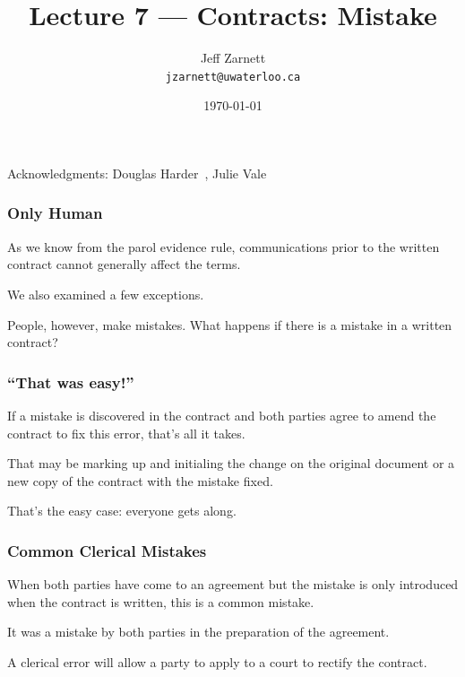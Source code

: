 

\title{Lecture 7 --- Contracts: Mistake }

\author{Jeff Zarnett \\ \small \texttt{jzarnett@uwaterloo.ca}}
\date{\today}




\begin{frame}
  \titlepage

\begin{center}
  \small{Acknowledgments: Douglas Harder~\cite{dwh}, Julie Vale~\cite{jv}}
  \end{center}
\end{frame}


\begin{frame}
\frametitle{Only Human}

As we know from the parol evidence rule, communications prior to the written contract cannot generally affect the terms.

We also examined a few exceptions. 

People, however, make mistakes. What happens if there is a mistake in a written contract?

\end{frame}


\begin{frame}
\frametitle{``That was easy!''}

If a mistake is discovered in the contract and both parties agree to amend the contract to fix this error, that's all it takes.

That may be marking up and initialing the change on the original document or a new copy of the contract with the mistake fixed.

That's the easy case: everyone gets along. 

\end{frame}

\begin{frame}
\frametitle{Common Clerical Mistakes}

When both parties have come to an agreement but the mistake is only introduced when the contract is written, this is a \alert{common mistake}.

It was a mistake by both parties in the preparation of the agreement.

A clerical error will allow a party to apply to a court to \alert{rectify} the contract.

\end{frame}


